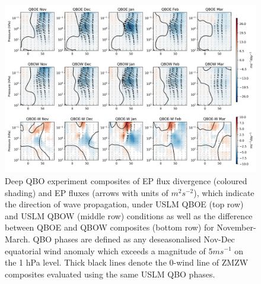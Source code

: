 \begin{figure}[h!]
\begin{center}
\noindent\includegraphics[width = \linewidth]{Figures/Figures-deepQBO/EP_flux_composites_by_month_QBO_phases_d_higher_anom_1hPa_5thresh.png}
\caption[EP flux composites under USLM QBO phases (deep QBO simulation)]{Deep QBO experiment composites of EP flux divergence (coloured shading) and EP fluxes (arrows with units of $m^2s^{-2}$), which indicate the direction of wave propagation, under USLM QBOE (top row) and USLM QBOW (middle row) conditions as well as the difference between QBOE and QBOW composites (bottom row) for November-March. QBO phases are defined as any deseasonalised Nov-Dec equatorial wind anomaly which exceeds a magnitude of $5ms^{-1}$ on the 1 hPa level. Thick black lines denote the 0-wind line of ZMZW composites evaluated using the same USLM QBO phases.}
\label{fig:EP_deep_SAO}
\end{center}
\end{figure}

